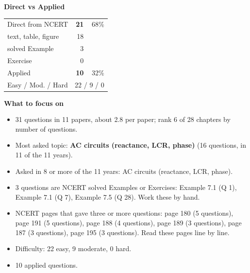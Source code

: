 \begin{minipage}[t]{0.34\linewidth}{\small\textbf{\color{crimson}Direct vs Applied}\par\smallskip
\begin{tabular}{@{}lrr@{}}\toprule
Direct from NCERT & \textbf{21} & 68\%\\
\quad text, table, figure & 18 &\\
\quad solved Example & 3 &\\
\quad Exercise & 0 &\\
Applied & \textbf{10} & 32\%\\\midrule
Easy / Mod. / Hard & \multicolumn{2}{r}{22 / 9 / 0}\\\bottomrule
\end{tabular}}\end{minipage}\hfill
\begin{minipage}[t]{0.63\linewidth}{\small\textbf{\color{crimson}What to focus on}\par\smallskip
\begin{itemize}[leftmargin=1.1em,itemsep=1pt,topsep=0pt]
\item 31 questions in 11 papers, about 2.8 per paper; rank 6 of 28 chapters by number of questions.
\item Most asked topic: \textbf{AC circuits (reactance, LCR, phase)} (16 questions, in 11 of the 11 years).
\item Asked in 8 or more of the 11 years: AC circuits (reactance, LCR, phase).
\item 3 questions are NCERT solved Examples or Exercises: Example 7.1 (Q 1), Example 7.1 (Q 7), Example 7.5 (Q 28). Work these by hand.
\item NCERT pages that gave three or more questions: page 180 (5 questions), page 191 (5 questions), page 188 (4 questions), page 189 (3 questions), page 187 (3 questions), page 195 (3 questions). Read these pages line by line.
\item Difficulty: 22 easy, 9 moderate, 0 hard.
\item 10 applied questions.
\end{itemize}}\end{minipage}\par
{}
